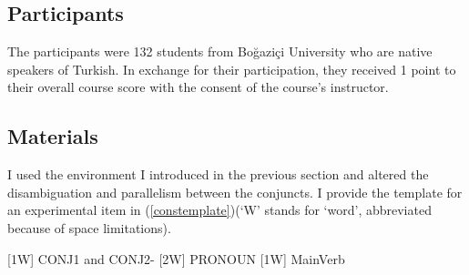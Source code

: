 



\subsection{Participants}
The participants were 132 students from Boğaziçi University who are native speakers of Turkish. In exchange for their participation, they received 1 point to their overall course score with the consent of the course's instructor.

\subsection{Materials}

I used the environment I introduced in the previous section and altered the disambiguation and parallelism between the conjuncts. I provide the template for an experimental item in (\ref{constemplate})(`W' stands for `word', abbreviated because of space limitations).

\begin{exe}
\ex \label{constemplate}
[1W] CONJ1 and CONJ2-{\Case} [2W] PRONOUN [1W] MainVerb
\end{exe}

